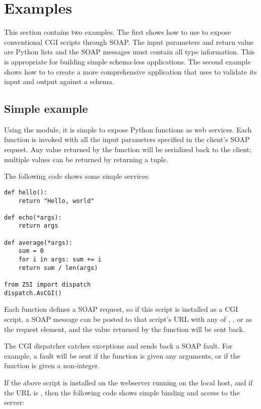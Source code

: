 \chapter{Examples}

This section contains two examples.  The first shows how to use \ZSI{}
to expose conventional CGI scripts through SOAP.
The input parameters and return value are Python lists and the SOAP
messages must contain all type information.
This is appropriate for building simple schema-less applications.
The second example shows how to to create a
more comprehensive application that uses \ZSI{} to validate its input
and output against a schema.

\section{Simple example}

Using the  module, it is simple to expose Python
functions as web services.
Each function is invoked with all the input parameters specified in the
client's SOAP request.
Any value returned by the function will be serialized back to the client;
multiple values can be returned by returning a tuple.

The following code shows some simple services:

\begin{verbatim}
def hello():
    return "Hello, world"

def echo(*args):
    return args

def average(*args):
    sum = 0
    for i in args: sum += i
    return sum / len(args)

from ZSI import dispatch
dispatch.AsCGI()
\end{verbatim}

Each function defines a SOAP request, so if this script is installed
as a CGI script, a SOAP message can be posted to that script's URL with any of
, , or  as the request element,
and the value returned by the function will be sent back.

The \ZSI{} CGI dispatcher catches exceptions and sends back a SOAP fault.
For example, a fault will be sent if the   function is given any
arguments, or if the  function is given a non-integer.

If the above script is installed on the webserver running on the local
host, and if the URL is , then the following
code shows simple binding and access to the server:

